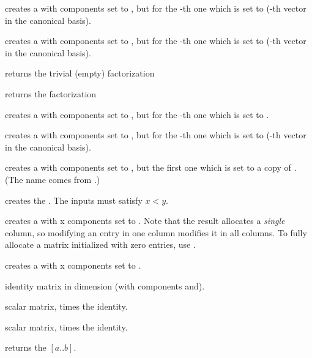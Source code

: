  creates a  with  components
set to , but for the -th one which is set to 
(-th vector in the canonical basis).

 creates a  with  components
set to , but for the -th one which is set to 
(-th vector in the canonical basis).

 returns the trivial (empty) factorization

 returns the factorization

 creates a  with 
components set to , but for the -th one which is set to
.

 creates a  with 
components set to , but for the -th one which is set to
 (-th vector in the canonical basis).

 creates a  with 
components set to , but the first one which is set to a copy
of . (The name comes from .)

\smallskip

 creates the  .
The inputs must satisfy $x < y$.

 creates a  with  x 
components set to . Note that the result allocates a
\emph{single} column, so modifying an entry in one column modifies it in
all columns. To fully allocate a matrix initialized with zero entries,
use .

 creates a  with  x
 components set to .

 identity matrix in dimension  (with
components  and).

 scalar matrix,  times the identity.

 scalar matrix,  times
the identity.

 returns the  $[a..b]$.

